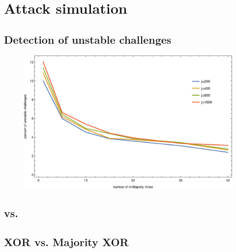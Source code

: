 \chapter{Attack simulation}
\label{cap:attacksimulations}


\section{Detection of unstable challenges}

\begin{figure}[ht]
\includegraphics[width=1.00\textwidth]{images/mv-measurements-unstableChallenges.eps}
\caption{}
\label{fig:cmamajorityvotemeasurementrelation}
\end{figure}

\section{\apufs vs. \mpufs}

\section{\acs{XOR} \apufs vs. Majority \acs{XOR} \apufs}

